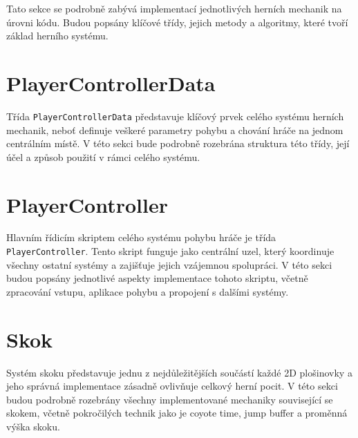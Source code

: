 Tato sekce se podrobně zabývá implementací jednotlivých herních mechanik na úrovni kódu. Budou popsány klíčové třídy, jejich metody a algoritmy, které tvoří základ herního systému.

\section{PlayerControllerData}

Třída \texttt{PlayerControllerData} představuje klíčový prvek celého systému herních mechanik, neboť definuje veškeré parametry pohybu a chování hráče na jednom centrálním místě. V této sekci bude podrobně rozebrána struktura této třídy, její účel a způsob použití v rámci celého systému.
\newpage



\newpage



\section{PlayerController}

Hlavním řídicím skriptem celého systému pohybu hráče je třída \texttt{PlayerController}. Tento skript funguje jako centrální uzel, který koordinuje všechny ostatní systémy a zajišťuje jejich vzájemnou spolupráci. V této sekci budou popsány jednotlivé aspekty implementace tohoto skriptu, včetně zpracování vstupu, aplikace pohybu a propojení s dalšími systémy.
\newpage

\newpage

\newpage

\newpage

\newpage

\newpage


\newpage




\section{Skok}

Systém skoku představuje jednu z nejdůležitějších součástí každé 2D plošinovky a jeho správná implementace zásadně ovlivňuje celkový herní pocit. V této sekci budou podrobně rozebrány všechny implementované mechaniky související se skokem, včetně pokročilých technik jako je coyote time, jump buffer a proměnná výška skoku.

